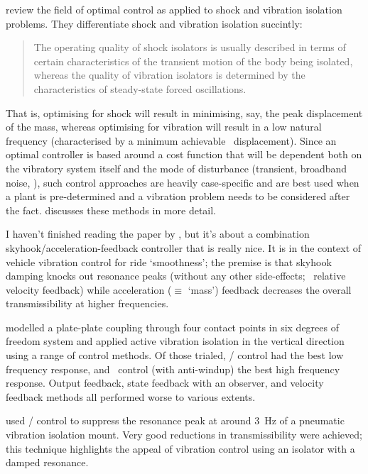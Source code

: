 \textcite{balandin1998} review the field of optimal control as applied to shock and vibration isolation problems.
They differentiate shock and vibration isolation succintly:
\begin{quote}
The operating quality of shock isolators is usually described in terms of certain characteristics of the transient motion of the body being isolated, whereas the quality of vibration isolators is determined by the characteristics of steady-state forced oscillations.
\end{quote}
That is, optimising for shock will result in minimising, say, the peak displacement of the mass, whereas optimising for vibration will result in a low natural frequency (characterised by a minimum achievable \RMS\ displacement).
Since an optimal controller is based around a cost function that will be dependent both on the vibratory system itself and the mode of disturbance (transient, broadband noise, \etc), such control approaches are heavily case-specific and are best used when a plant is pre-determined and a vibration problem needs to be considered after the fact.
\textcite{bolotnik2001} discusses these methods in more detail.

I haven't finished reading the paper by \textcite{savaresi2007}, but it's about a combination skyhook/acceleration-feedback controller that is really nice.
It is in the context of vehicle vibration control for ride `smoothness'; the premise is that skyhook damping knocks out resonance peaks (without any other side-effects; \cf\ relative velocity feedback) while acceleration ($\equiv$ `mass') feedback decreases the overall transmissibility at higher frequencies.

\textcite{kerber2007} modelled a plate-plate coupling through four contact points in six degrees of freedom system and applied active vibration isolation in the vertical direction using a range of control methods.
Of those trialed, \Hinf/ control had the best low frequency response, and \PI\ control (with anti-windup) the best high frequency response.
Output feedback, state feedback with an observer, and velocity feedback methods all performed worse to various extents.

\textcite{chen2007} used \Hinf/ control to suppress the resonance peak at around \SI{3}{Hz} of a pneumatic vibration isolation mount.
Very good reductions in transmissibility were achieved; this technique highlights the appeal of vibration control using an isolator with a damped resonance.

